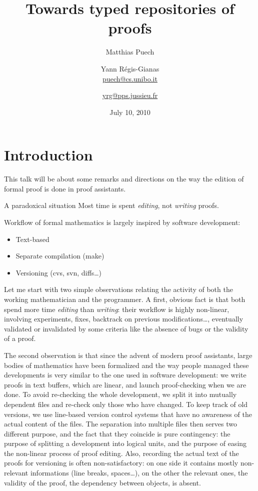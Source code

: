 \documentclass[ignorenonframetext,red]{beamer}
\title{Towards typed repositories of proofs}
\date{July 10, 2010}
\author[Matthias Puech \& Yann Régis-Gianas] {
Matthias Puech\inst{1} \and Yann Régis-Gianas\inst{2} \\
{\small \url{puech@cs.unibo.it}} \and {\small \url{yrg@pps.jussieu.fr}}
}
\institute {
  \inst 1 {\small Dept. of Computer Science, University of Bologna} \and
  \inst 2 {\small University Paris 7, CNRS, and INRIA, PPS, team ${\pi}r^2$}
}
\begin{document}
\begin{frame}
  \titlepage
\end{frame}
\section*{Introduction}

This talk will be about some remarks and directions on the way the
edition of formal proof is done in proof assistants.

\begin{frame}{A paradoxical situation}
  Most time is spent \emph{editing}, not \emph{writing} proofs.

  Workflow of formal mathematics is largely inspired by software
  development:
  \begin{itemize}
  \item Text-based
  \item Separate compilation (\textsf{make})
  \item Versioning (\textsf{cvs}, \textsf{svn}, \textsf{diff}s\ldots)
  \end{itemize}
\end{frame}

Let me start with two simple observations relating the activity of
both the working mathematician and the programmer. A first, obvious
fact is that both spend more time \emph{editing} than \emph{writing}:
their workflow is highly non-linear, involving experiments, fixes,
backtrack on previous modifications\ldots, eventually validated or
invalidated by some criteria like the absence of bugs or the validity
of a proof.

The second observation is that since the advent of modern proof
assistants, large bodies of mathematics have been formalized and the
way people managed these developments is very similar to the one used
in software development: we write proofs in text buffers, which are
linear, and launch proof-checking when we are done. To avoid
re-checking the whole development, we split it into mutually dependent
files and re-check only those who have changed. To keep track of old
versions, we use line-based version control systems that have no
awareness of the actual content of the files. The separation into
multiple files then serves two different purpose, and the fact that
they coincide is pure contingency: the purpose of splitting a
development into logical units, and the purpose of easing the
non-linear process of proof editing. Also, recording the actual text
of the proofs for versioning is often non-satisfactory: on one side it
contains mostly non-relevant informations (line breaks, spaces\ldots),
on the other the relevant ones, the validity of the proof, the
dependency between objects, is absent.
\end{document}
